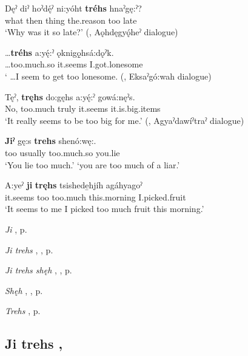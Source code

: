 \ea
\label{ex:jpar2}
\gll Dęˀ diˀ hoˀdę́ˀ ni:yóht \textbf{tréhs} hnaˀgę:ˀ? \\
what then thing the.reason too late\\
\glt ‘Why was it so late?’ (\cite[508]{mithun_watewayestanih_1984}, Aǫhdęgyǫ́heˀ dialogue)
\z

\ea
\label{ex:jpar3}
\gll …\textbf{tréhs} a:yę́:ˀ ǫknigǫ̱hsá:dǫˀk. \\
…too.much.so it.seems I.got.lonesome\\
\glt ‘ …I seem to get too lonesome. (\cite[88]{mithun_watewayestanih_1984}, Eksaˀgó:wah dialogue)
\z


\ea
\label{ex:jpar4}
\gll Tęˀ, \textbf{tręhs} do:gęhs a:yę́:ˀ gowá:nęˀs. \\
No, too.much truly it.seems it.is.big.items\\
\glt ‘It really seems to be too big for me.’ (\cite[225]{mithun_watewayestanih_1984}, Agyaˀdawíˀtraˀ dialogue)
\z

\ea
\label{ex:jpar5}
\gll \textbf{Jiˀ} gę:s \textbf{trehs} shenó:wę:. \\
too usually too.much.so you.lie\\
\glt ‘You lie too much.’ `you are too much of a liar.’
\z

\ea
\label{ex:jpar6}
\gll A:yeˀ \textbf{ji} \textbf{tręhs} tsishede̱hjíh agáhyagoˀ \\
it.seems too too.much this.morning I.picked.fruit\\
\glt ‘It seems to me I picked too much fruit this morning.’
\z

\begin{CayugaRelated}
\item \textit{Ji} , p. \pageref{p:[ji]}\\
\item \textit{Ji trehs} , , p. \pageref{p:[ji trehs] ‘because’}\\
\item \textit{Ji trehs shęh} , , p. \pageref{p:[ji trehs shęh]}\\
\item \textit{Shęh} , , p. \pageref{p:[shęh] `because’}\\
\item \textit{Trehs} , p. \pageref{p:[trehs, ji trehs]}
\end{CayugaRelated}


\subsection*{\textbf{Ji trehs} , } \label{p:[ji trehs] ‘because’}

